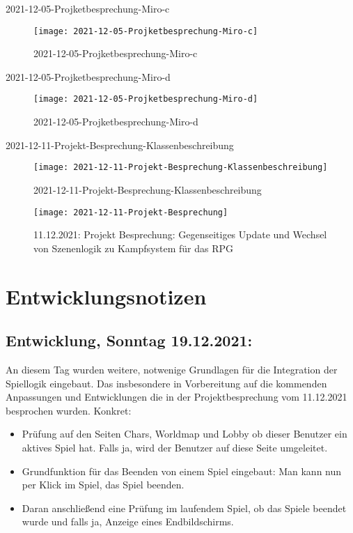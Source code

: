 2021-12-05-Projketbesprechung-Miro-c 
\begin{figure}[H]
    \centering
    \caption[]{2021-12-05-Projketbesprechung-Miro-c}
    \label{fig:2021-12-05-Projketbesprechung-Miro-c}
    \texttt{[image: 2021-12-05-Projketbesprechung-Miro-c]}
\end{figure}

2021-12-05-Projketbesprechung-Miro-d 
\begin{figure}[H]
    \centering
    \caption[]{2021-12-05-Projketbesprechung-Miro-d}
    \label{fig:2021-12-05-Projketbesprechung-Miro-d}
    \texttt{[image: 2021-12-05-Projketbesprechung-Miro-d]}
\end{figure}

2021-12-11-Projekt-Besprechung-Klassenbeschreibung 
\begin{figure}[H]
    \centering
    \caption[]{2021-12-11-Projekt-Besprechung-Klassenbeschreibung}
    \label{fig:2021-12-11-Projekt-Besprechung-Klassenbeschreibung}
    \texttt{[image: 2021-12-11-Projekt-Besprechung-Klassenbeschreibung]}
\end{figure}


\begin{figure}[H]
    \centering
    \caption[]{11.12.2021: Projekt Besprechung: Gegenseitiges Update und Wechsel von Szenenlogik zu Kampfsystem für das RPG }
    \label{fig:2021-12-11-Projekt-Besprechung}
    \texttt{[image: 2021-12-11-Projekt-Besprechung]}
\end{figure}



\section{Entwicklungsnotizen}

\subsection{Entwicklung, Sonntag 19.12.2021:}

An diesem Tag wurden weitere, notwenige Grundlagen für die Integration der Spiellogik eingebaut. Das insbesondere in Vorbereitung auf die kommenden Anpassungen und Entwicklungen die in der Projektbesprechung vom 11.12.2021 besprochen wurden. 
Konkret: 

\begin{itemize}
	\item Prüfung auf den Seiten Chars, Worldmap und Lobby ob dieser Benutzer ein aktives Spiel hat. Falls ja, wird der Benutzer auf diese Seite umgeleitet.
	\item Grundfunktion für das Beenden von einem Spiel eingebaut: Man kann nun per Klick im Spiel, das Spiel beenden.
	\item Daran anschließend eine Prüfung im laufendem Spiel, ob das Spiele beendet wurde und falls ja, Anzeige eines Endbildschirms.
\end{itemize}

